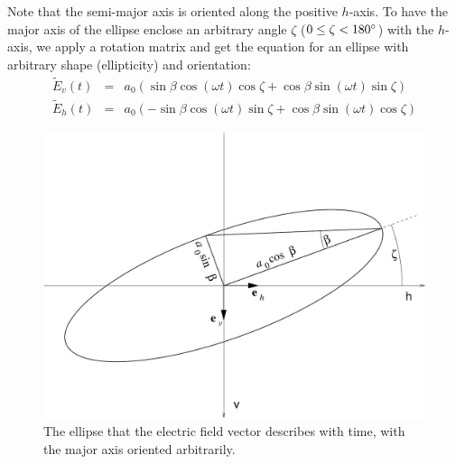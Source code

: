 Note that the semi-major axis is oriented along the positive $h$-axis.  To
have the major axis of the ellipse enclose an arbitrary angle $\zeta$
($0 \leq \zeta < 180^\circ$) with the $h$-axis, we apply a rotation
matrix and get the equation for an ellipse with arbitrary shape
(ellipticity) and orientation:
\begin{eqnarray}
  \label{eq:polarization:ellipse_rotated1}
 \tilde{E}_v (t) &=&  a_0(  \sin\beta \cos(\omega t) \cos\zeta
                           +\cos\beta \sin(\omega t) \sin\zeta )\\
  \label{eq:polarization:ellipse_rotated2}
 \tilde{E}_h (t) &=&  a_0( -\sin\beta \cos(\omega t) \sin\zeta
                           +\cos\beta \sin(\omega t) \cos\zeta )
\end{eqnarray}


\begin{figure}[!h]
 \begin{center}
  \begin{minipage}[c]{0.9\textwidth}
   \begin{center}
    \includegraphics*[width=0.9\hsize]{Figs/pol_ellipse_arbitrary}
   \end{center}
  \end{minipage}
  \begin{minipage}[c]{0.9\textwidth}
   \caption{The ellipse that the electric field vector describes with
     time, with the major axis oriented arbitrarily.}
   \label{fig:polarizaion:ellipse_arbitrary}
  \end{minipage}
 \end{center}
\end{figure}   


